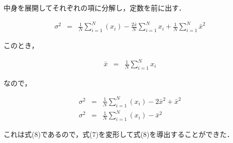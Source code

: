 \documentclass[titlepage]{jarticle}
\begin{document}
中身を展開してそれぞれの項に分解し，定数を前に出す．

\begin{eqnarray*}
  \sigma^{2} & = & \frac{1}{N} \sum_{i=1}^{N}(x_{i}) - \frac{2\bar{x}}{N} \sum_{i=1}^{N}x_{i}+\frac{1}{N} \sum_{i=1}^{N}\bar{x}^{2}
\end{eqnarray*}

このとき，

\begin{eqnarray*}
  \bar{x} & = & \frac{1}{N} \sum_{i=1}^{N}x_{i}
\end{eqnarray*}

なので，

\begin{eqnarray*}
  \sigma^{2} & = & \frac{1}{N} \sum_{i=1}^{N}(x_{i}) - 2\bar{x}^{2} + \bar{x}^{2}\\
  \sigma^{2} & = & \frac{1}{N} \sum_{i=1}^{N}(x_{i}) - \bar{x}^{2}
\end{eqnarray*}

これは式(8)であるので，式(7)を変形して式(8)を導出することができた．
\end{document}

